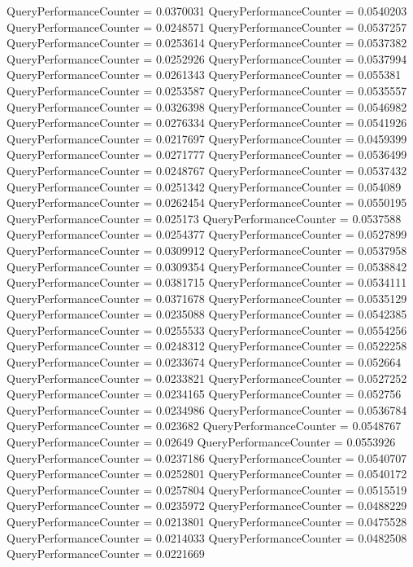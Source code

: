 \documentclass[9pt]{article}
\theoremstyle{plain}
\theoremstyle{definition}
\theoremstyle{remark}
\numberwithin{equation}{section}
\begin{document}
QueryPerformanceCounter  =  0.0370031
QueryPerformanceCounter  =  0.0540203
QueryPerformanceCounter  =  0.0248571
QueryPerformanceCounter  =  0.0537257
QueryPerformanceCounter  =  0.0253614
QueryPerformanceCounter  =  0.0537382
QueryPerformanceCounter  =  0.0252926
QueryPerformanceCounter  =  0.0537994
QueryPerformanceCounter  =  0.0261343
QueryPerformanceCounter  =  0.055381
QueryPerformanceCounter  =  0.0253587
QueryPerformanceCounter  =  0.0535557
QueryPerformanceCounter  =  0.0326398
QueryPerformanceCounter  =  0.0546982
QueryPerformanceCounter  =  0.0276334
QueryPerformanceCounter  =  0.0541926
QueryPerformanceCounter  =  0.0217697
QueryPerformanceCounter  =  0.0459399
QueryPerformanceCounter  =  0.0271777
QueryPerformanceCounter  =  0.0536499
QueryPerformanceCounter  =  0.0248767
QueryPerformanceCounter  =  0.0537432
QueryPerformanceCounter  =  0.0251342
QueryPerformanceCounter  =  0.054089
QueryPerformanceCounter  =  0.0262454
QueryPerformanceCounter  =  0.0550195
QueryPerformanceCounter  =  0.025173
QueryPerformanceCounter  =  0.0537588
QueryPerformanceCounter  =  0.0254377
QueryPerformanceCounter  =  0.0527899
QueryPerformanceCounter  =  0.0309912
QueryPerformanceCounter  =  0.0537958
QueryPerformanceCounter  =  0.0309354
QueryPerformanceCounter  =  0.0538842
QueryPerformanceCounter  =  0.0381715
QueryPerformanceCounter  =  0.0534111
QueryPerformanceCounter  =  0.0371678
QueryPerformanceCounter  =  0.0535129
QueryPerformanceCounter  =  0.0235088
QueryPerformanceCounter  =  0.0542385
QueryPerformanceCounter  =  0.0255533
QueryPerformanceCounter  =  0.0554256
QueryPerformanceCounter  =  0.0248312
QueryPerformanceCounter  =  0.0522258
QueryPerformanceCounter  =  0.0233674
QueryPerformanceCounter  =  0.052664
QueryPerformanceCounter  =  0.0233821
QueryPerformanceCounter  =  0.0527252
QueryPerformanceCounter  =  0.0234165
QueryPerformanceCounter  =  0.052756
QueryPerformanceCounter  =  0.0234986
QueryPerformanceCounter  =  0.0536784
QueryPerformanceCounter  =  0.023682
QueryPerformanceCounter  =  0.0548767
QueryPerformanceCounter  =  0.02649
QueryPerformanceCounter  =  0.0553926
QueryPerformanceCounter  =  0.0237186
QueryPerformanceCounter  =  0.0540707
QueryPerformanceCounter  =  0.0252801
QueryPerformanceCounter  =  0.0540172
QueryPerformanceCounter  =  0.0257804
QueryPerformanceCounter  =  0.0515519
QueryPerformanceCounter  =  0.0235972
QueryPerformanceCounter  =  0.0488229
QueryPerformanceCounter  =  0.0213801
QueryPerformanceCounter  =  0.0475528
QueryPerformanceCounter  =  0.0214033
QueryPerformanceCounter  =  0.0482508
QueryPerformanceCounter  =  0.0221669
\end{document}
